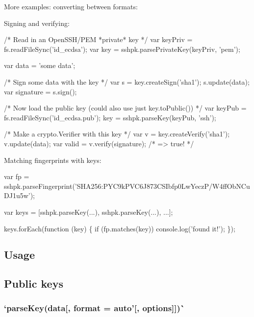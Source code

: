 More examples\+: converting between formats\+:




Signing and verifying\+:


\begin{DoxyCode}
/* Read in an OpenSSH/PEM *private* key */
var keyPriv = fs.readFileSync('id\_ecdsa');
var key = sshpk.parsePrivateKey(keyPriv, 'pem');

var data = 'some data';

/* Sign some data with the key */
var s = key.createSign('sha1');
s.update(data);
var signature = s.sign();

/* Now load the public key (could also use just key.toPublic()) */
var keyPub = fs.readFileSync('id\_ecdsa.pub');
key = sshpk.parseKey(keyPub, 'ssh');

/* Make a crypto.Verifier with this key */
var v = key.createVerify('sha1');
v.update(data);
var valid = v.verify(signature);
/* => true! */
\end{DoxyCode}


Matching fingerprints with keys\+:


\begin{DoxyCode}
var fp = sshpk.parseFingerprint('SHA256:PYC9kPVC6J873CSIbfp0LwYeczP/W4ffObNCuDJ1u5w');

var keys = [sshpk.parseKey(...), sshpk.parseKey(...), ...];

keys.forEach(function (key) \{
    if (fp.matches(key))
        console.log('found it!');
\});
\end{DoxyCode}


\subsection*{Usage }

\subsection*{Public keys}

\subsubsection*{`parse\+Key(data\mbox{[}, format = \textquotesingle{}auto'\mbox{[}, options\mbox{]}\mbox{]})\`{}}

